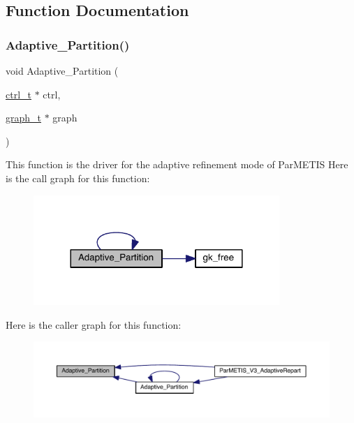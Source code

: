 \subsection{Function Documentation}
\mbox{\label{a00338_a4bfface1ffce942d966b638a079f0833}} 
\subsubsection{\texorpdfstring{Adaptive\+\_\+\+Partition()}{Adaptive\_Partition()}}
{\footnotesize\ttfamily void Adaptive\+\_\+\+Partition (\begin{DoxyParamCaption}\item[{\hyperlink{a00742}{ctrl\+\_\+t} $\ast$}]{ctrl,  }\item[{\hyperlink{a00734}{graph\+\_\+t} $\ast$}]{graph }\end{DoxyParamCaption})}

This function is the driver for the adaptive refinement mode of Par\+M\+E\+T\+IS Here is the call graph for this function\+:\nopagebreak
\begin{figure}[H]
\begin{center}
\leavevmode
\includegraphics[width=264pt]{a00338_a4bfface1ffce942d966b638a079f0833_cgraph}
\end{center}
\end{figure}
Here is the caller graph for this function\+:\nopagebreak
\begin{figure}[H]
\begin{center}
\leavevmode
\includegraphics[width=350pt]{a00338_a4bfface1ffce942d966b638a079f0833_icgraph}
\end{center}
\end{figure}
\mbox{\label{a00338_af584de3fd53c9e04d79f5037b546b9cc}} 
